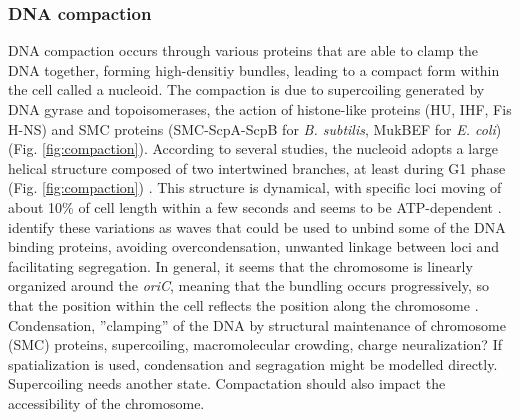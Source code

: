 \subsubsection{DNA compaction}
DNA compaction occurs through various proteins that are able to clamp the DNA together, forming high-densitiy bundles, leading to a compact form within the cell called a nucleoid. The compaction is due to supercoiling generated by DNA gyrase and topoisomerases, the action of histone-like proteins (HU, IHF, Fis H-NS) and SMC proteins (SMC-ScpA-ScpB for \textit{B. subtilis}, MukBEF for \textit{E. coli})(Fig. \ref{fig:compaction}). According to several studies, the nucleoid adopts a large helical structure composed of two intertwined branches, at least during G1 phase (Fig. \ref{fig:compaction}) \citep{berlatzky_spatial_2008, ptacin_chromosome_2013, fisher_four-dimensional_2013}. This structure is dynamical, with specific loci moving of about 10\% of cell length within a few seconds \citep{wiggins_strong_2010,fisher_four-dimensional_2013} and seems to be ATP-dependent \citep{fisher_four-dimensonal_2013,weber_nonthermal_2012}. \citet{fisher_four-dimensional_2013} identify these variations as waves that could be used to unbind some of the DNA binding proteins, avoiding overcondensation, unwanted linkage between loci and facilitating segregation. In general, it seems that the chromosome is linearly organized around the \textit{oriC}, meaning that the bundling occurs progressively, so that the position within the cell reflects the position along the chromosome \citep{wiggins_strong_2010}.
\textcolor[rgb]{1.00,0.00,0.00}{Condensation, ”clamping” of the DNA by structural maintenance of chromosome (SMC) proteins, supercoiling, macromolecular crowding, charge neuralization?}
If spatialization is used, condensation and segragation might be modelled directly. Supercoiling needs another state.
\textcolor[rgb]{1.00,0.00,0.00}{Compactation should also impact the accessibility of the chromosome.}

